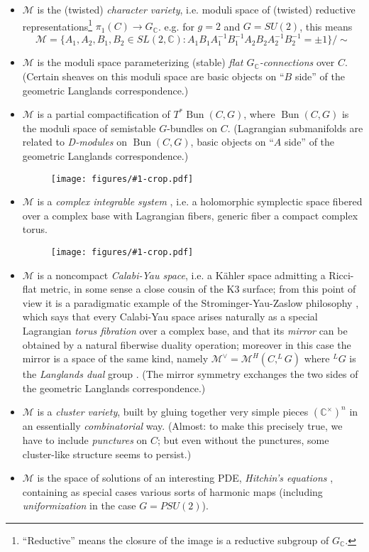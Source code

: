 \documentclass[12pt,letterpaper,reqno]{amsart}
\numberwithin{equation}{section}
\newcommand{\cM}{\ensuremath{\mathcal M}}
\newcommand{\C}{\ensuremath{\mathbb C}}
\newcommand{\kahler}{K\"ahler\xspace}
\newcommand{\ti}[1]{\textit{#1}}
\DeclareMathOperator{\Bun}{Bun}
\newcommand{\insfig}[2]{\begin{figure}[htbp] \centering \texttt{[image: figures/\#1-crop.pdf]} \label{fig:#1} \end{figure}}
\begin{document}
\begin{itemize}
\item $\cM$ is the (twisted) \ti{character variety}, i.e. moduli space of
(twisted) 
reductive representations\footnote{``Reductive'' means the closure of 
the image is a reductive subgroup of $G_\C$.}
$\pi_1(C) \to G_\C$.
e.g. for $g=2$ and $G = SU(2)$, 
this means
\begin{equation}
  \cM = \{ A_1,A_2,B_1,B_2 \in SL(2,\C): A_1 B_1 A_1^{-1} B_1^{-1} A_2 B_2 A_2^{-1} B_2^{-1} = \pm 1 \} / \sim
\end{equation}
\item $\cM$ is the moduli space parameterizing (stable) \ti{flat $G_\C$-connections}
over $C$. (Certain sheaves on this moduli space are 
basic objects on ``$B$ side'' of the geometric Langlands correspondence.)
\item $\cM$ is a partial compactification of $T^* \Bun(C,G)$, where $\Bun(C,G)$ is the moduli space of semistable $G$-bundles on $C$. (Lagrangian submanifolds are related to \ti{D-modules} on $\Bun(C,G)$, basic objects on ``$A$ side'' 
of the geometric Langlands correspondence.)
\insfig{higgs-bundles-2}{0.55}
\item $\cM$ is a \ti{complex integrable system} \cite{MR88i:58068}, i.e. a holomorphic
symplectic space fibered over a complex base with Lagrangian
fibers, generic fiber a compact complex torus. \insfig{higgs-bundles-1}{0.8}
\item $\cM$ is a noncompact \ti{Calabi-Yau space}, i.e. a \kahler
space admitting a Ricci-flat metric, in some sense a close 
cousin of the K3 surface; from this point of view
it is a paradigmatic example of the Strominger-Yau-Zaslow
philosophy \cite{Strominger:1996it}, 
which says that every Calabi-Yau space arises naturally
as a special Lagrangian \ti{torus fibration} over a complex base,
and that its \ti{mirror} can be obtained by a natural fiberwise duality
operation; moreover in this case the mirror is a space of the same kind,
namely $\cM^\vee = \cM^H(C,^L G)$ where 
$^L G$ is the \ti{Langlands dual} group \cite{mlh,MR2957305}.
(The mirror symmetry
exchanges the two sides of the geometric Langlands correspondence.)
\item $\cM$ is a \ti{cluster variety}, built by gluing together
very simple pieces $(\C^\times)^n$ in an essentially \ti{combinatorial} way. (Almost: to make this precisely true, we have to include \ti{punctures} on $C$; but even without the punctures, some cluster-like
structure seems to persist.)
\item $\cM$ is the space of solutions of an interesting PDE, \ti{Hitchin's equations} \cite{MR89a:32021}, containing as special cases various sorts of harmonic maps (including \ti{uniformization} in the case $G = PSU(2)$).
\end{itemize}
\end{document}
